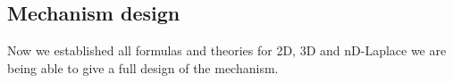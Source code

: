 \subsection{Mechanism design}
Now we established all formulas and theories for 2D, 3D and nD-Laplace we are being able to give a full design of the mechanism.
